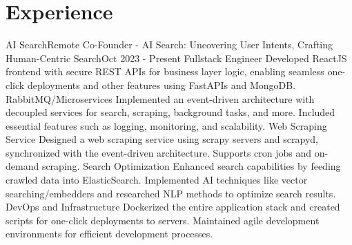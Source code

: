 \section{Experience}
\resumeSubHeadingListStart
\resumeSubheading
{AI Search}{Remote}
{Co-Founder - AI Search: Uncovering User Intents, Crafting Human-Centric Search}{Oct 2023 - Present}
\resumeItemListStart
\resumeItem
{Fullstack Engineer}
{Developed ReactJS frontend with secure REST APIs for business layer logic, enabling seamless one-click deployments and other features using FastAPIs and MongoDB.}
\resumeItem
{RabbitMQ/Microservices}
{Implemented an event-driven architecture with decoupled services for search, scraping, background tasks, and more. Included essential features such as logging, monitoring, and scalability.}
\resumeItem
{Web Scraping Service}
{Designed a web scraping service using scrapy servers and scrapyd, synchronized with the event-driven architecture. Supports cron jobs and on-demand scraping.}
\resumeItem
{Search Optimization}
{Enhanced search capabilities by feeding crawled data into ElasticSearch. Implemented AI techniques like vector searching/embedders and researched NLP methods to optimize search results.}
\resumeItem
{DevOps and Infrastructure}
{Dockerized the entire application stack and created scripts for one-click deployments to servers. Maintained agile development environments for efficient development processes.}
\resumeItemListEnd
\resumeSubHeadingListEnd





